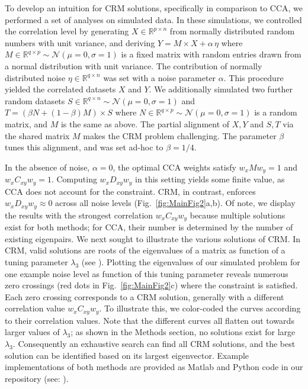 \documentclass{article}
\newcommand{\R}{\mathbb{R}}
\begin{document}
To develop an intuition for CRM solutions, specifically in comparison to CCA, we performed a set of analyses on simulated data. In these simulations, we controlled the correlation level by generating  $X\in\R^{p\times n}$ from normally distributed random numbers with unit variance, and deriving $Y=M\times X + \alpha\,\eta $ where $M\in\R^{q\times p}\sim\mathcal{N}(\mu=0,\sigma=1)$ is a fixed matrix with random entries drawn from a normal distribution with unit variance. The contribution of normally distributed noise $\eta\in\R^{q\times n}$ was set with a noise parameter $\alpha$. This procedure yielded the correlated datasets $X$ and $Y$. We additionally simulated two further random datasets $S\in\R^{q\times n}\sim\mathcal{N}(\mu=0,\sigma=1)$ and $T=(\beta N + (1-\beta)M) \times S$ where $N\in\R^{q\times p}\sim\mathcal{N}(\mu=0,\sigma=1)$ is a random matrix, and $M$ is the same as above. The partial alignment of $X,Y$ and $S,T$ via the shared matrix $M$ makes the CRM problem challenging. The parameter $\beta$ tunes this alignment, and was set ad-hoc to $\beta=1/4$.

In the absence of noise, $\alpha=0$, the optimal CCA weights satisfy $w_xMw_y=1$ and $w_xC_{xy}w_y=1$. Computing $w_xD_{xy}w_y$ in this setting yields some finite value, as CCA does not account for the constraint. CRM, in contrast, enforces $w_xD_{xy}w_y\approx0$ across all noise levels (Fig.~\ref{fig:MainFig2}a,b). Of note, we display the results with the strongest correlation $w_xC_{xy}w_y$ because multiple solutions exist for both methods; for CCA, their number is determined by the number of existing eigenpairs. We next sought to illustrate the various solutions of CRM. In CRM, valid solutions are roots of the eigenvalues of a matrix as function of a tuning parameter $\lambda_3$ (see ). Plotting the eigenvalues of our simulated problem for one example noise level as function of this tuning parameter reveals numerous zero crossings (red dots in Fig.~\ref{fig:MainFig2}c) where the constraint is satisfied. Each zero crossing corresponds to a CRM solution, generally with a different correlation value $w_xC_{xy}w_y$. To illustrate this, we color-coded the curves according to their correlation values. Note that the different curves all flatten out towards larger values of $\lambda_3$; as shown in the Methods section, no solutions exist for large $\lambda_3$. Consequently an exhaustive search can find all CRM solutions, and the best solution can be identified based on its largest eigenvector. Example implementations of both methods are provided as Matlab and Python code in our repository (see: ).
\end{document}
